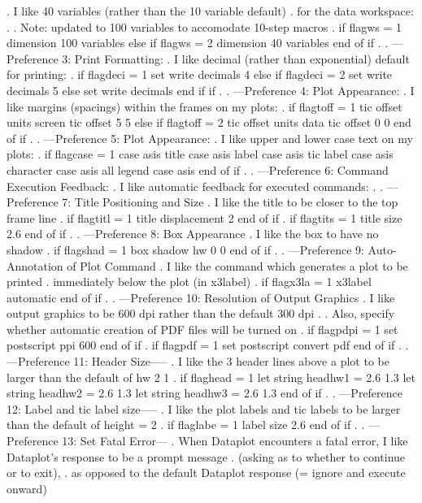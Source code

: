 .    I like 40 variables (rather than the 10 variable default)
.    for the data workspace:
.
.    Note: updated to 100 variables to accomodate 10-step macros
.
if flagws = 1
   dimension 100 variables
else if flagws = 2
   dimension 40 variables
end of if
.
. ---Preference 3: Print Formatting:
.    I like decimal (rather than exponential) default for printing:
.
if flagdeci = 1
   set write decimals 4
else if flagdeci = 2
   set write decimals 5
else
   set write decimals
end if if
.
. ---Preference 4: Plot Appearance:
.    I like margins (spacings) within the frames on my plots:
.
if flagtoff = 1
   tic offset units screen
   tic offset 5 5
else if flagtoff = 2
   tic offset units data
   tic offset 0 0
end of if
.
. ---Preference 5: Plot Appearance:
.    I like upper and lower case text on my plots:
.
if flagcase = 1
   case asis
   title case asis
   label case asis
   tic label case asis
   character case asis all
   legend case asis
end of if
.
. ---Preference 6: Command Execution Feedback:
.    I like automatic feedback for executed commands:
.
. ---Preference 7: Title Positioning and Size
.    I like the title to be closer to the top frame line
.
if flagtitl = 1
   title displacement 2
end of if
.
if flagtits = 1
   title size 2.6
end of if
.
. ---Preference 8: Box Appearance
.    I like the box to have no shadow
.
if flagshad = 1
   box shadow hw 0 0
end of if
.
. ---Preference 9: Auto-Annotation of Plot Command
.    I like the command which generates a plot to be printed
.    immediately below the plot (in x3label)
.
if flagx3la = 1
   x3label automatic
end of if
.
. ---Preference 10: Resolution of Output Graphics
.    I like output graphics to be 600 dpi rather than the default 300 dpi
.
.    Also, specify whether automatic creation of PDF files will be turned on
.
if flagpdpi = 1
   set postscript ppi 600
end of if
.
if flagpdf = 1
   set postscript convert pdf
end of if
.
. ---Preference 11: Header Size-----
.    I like the 3 header lines above a plot to be larger than the default of     hw 2 1
.
if flaghead = 1
   let string headhw1 = 2.6 1.3
   let string headhw2 = 2.6 1.3
   let string headhw3 = 2.6 1.3
end of if
.
. ---Preference 12: Label and tic label size-----
.    I like the plot labels and tic labels to be larger than the default of    height = 2
.
if flaglabe = 1
   label size 2.6
end of if
.
. ---Preference 13: Set Fatal Error---
.    When Dataplot encounters a fatal error, I like Dataplot's response to be a prompt message
.    (asking as to whether to continue or to exit),
.    as opposed to the default Dataplot response (= ignore and execute onward)
